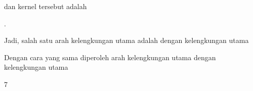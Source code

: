 {dan kernel tersebut adalah

 { . }

Jadi, salah satu arah kelengkungan utama adalah
 dengan kelengkungan utama

Dengan cara yang sama diperoleh arah kelengkungan utama
 dengan kelengkungan utama

 }



{7}

